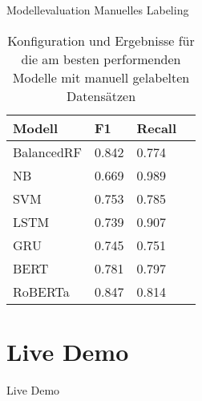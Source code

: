 \documentclass[aspectratio=169]{beamer} %
\begin{document}
\begin{frame}{Modellevaluation Manuelles Labeling}

\begin{table}[h]
	\begin{tabular}{|p{5.5cm}|p{2cm}|p{2cm}|p{2cm}|}
		\hline
			\textbf{Modell} & \textbf{F1} & \textbf{Recall} \\
		\hline   
                BalancedRF & 0.842 &	0.774 \\
			NB & 0.669 & 0.989\\
			SVM	& 0.753 & 0.785 \\
			LSTM 	& 0.739 & 0.907  \\
			GRU & 0.745 & 0.751 \\
                BERT &  0.781 & 0.797 \\
                RoBERTa & 0.847 & 0.814	\\
		\hline
\end{tabular}
\caption{Konfiguration und Ergebnisse für die am besten performenden Modelle mit manuell gelabelten Datensätzen}
\label{tab:model_performance}
\end{table}

\end{frame}
\section{Live Demo}
\begin{frame}{Live Demo}
    
\end{frame}
\end{document}
